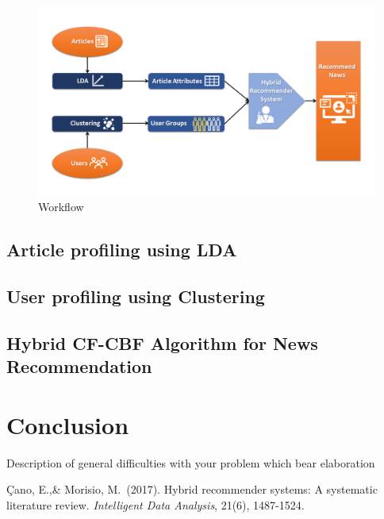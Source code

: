 \documentclass{article}
\begin{document}
\begin{figure}
\includegraphics[scale=.40]{NeuRIPS2019/Slide1.PNG}
\caption{Workflow}
\end{figure}

\subsection{Article profiling using LDA}

\subsection{User profiling using Clustering}

\subsection{Hybrid CF-CBF Algorithm for News Recommendation}

\section{Conclusion}

{Description of general difficulties with your problem which bear elaboration
}

\begin{thebibliography}{9}

 Çano, E.,\& Morisio, M.\ (2017). Hybrid recommender systems: A systematic literature review. {\it Intelligent Data Analysis}, 21(6), 1487-1524.
\end{thebibliography}
\end{document}
